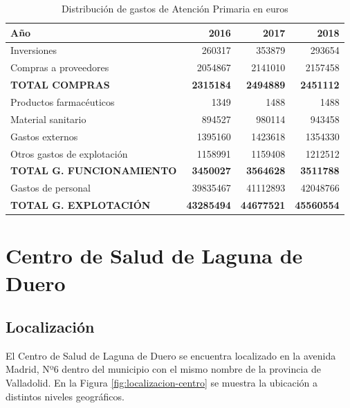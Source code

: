 \begin{table}[H]
    \centering
    \begin{tabular}{lrrr}
        \toprule
        Año                              & 2016              & 2017              & 2018              \\
        \midrule
        Inversiones                      & 260317            & 353879            & 293654            \\
        Compras a proveedores            & 2054867           & 2141010           & 2157458           \\
        \textbf{TOTAL COMPRAS}           & \textbf{2315184}  & \textbf{2494889}  & \textbf{2451112}  \\
        \midrule
        Productos farmacéuticos          & 1349              & 1488              & 1488              \\
        Material sanitario               & 894527            & 980114            & 943458            \\
        Gastos externos                  & 1395160           & 1423618           & 1354330           \\
        Otros gastos de explotación      & 1158991           & 1159408           & 1212512           \\

        \textbf{TOTAL G. FUNCIONAMIENTO} & \textbf{3450027}  & \textbf{3564628}  & \textbf{3511788}  \\
        \midrule
        Gastos de personal               & 39835467          & 41112893          & 42048766          \\
        \textbf{TOTAL G. EXPLOTACIÓN}    & \textbf{43285494} & \textbf{44677521} & \textbf{45560554} \\
        \bottomrule
    \end{tabular}
    \caption{Distribución de gastos de Atención Primaria en euros}
    \label{tab:gastos-primaria}
\end{table}

\section{Centro de Salud de Laguna de Duero}

\subsection{Localización}

El Centro de Salud de Laguna de Duero se encuentra localizado en la avenida Madrid, Nº6 dentro del municipio con el mismo nombre de la provincia de Valladolid. En la Figura \ref{fig:localizacion-centro} se muestra la ubicación a distintos niveles geográficos.

